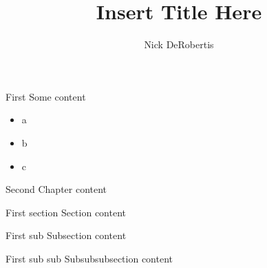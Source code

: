 \documentclass[]{uf-thesis-dissertation}
\title{Insert Title Here}
\author{Nick DeRobertis}
\begin{document}
\begin{chapter}{First}
Some content
\begin{itemize}
\item a
\item b
\item c
\end{itemize}
\end{chapter}
\begin{chapter}{Second}
Chapter content
\begin{section}{First section}
Section content
\begin{subsection}{First sub}
Subsection content
\begin{subsubsection}{First sub sub}
Subsubsubsection content
\citep{person}
\end{subsubsection}
\end{subsection}
\end{section}
\end{chapter}
\end{document}
